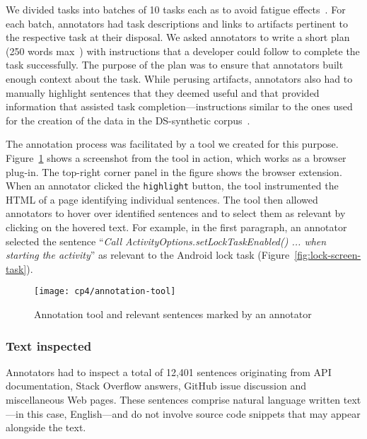 We divided tasks into batches of 10 tasks each as to avoid fatigue effects~\cite{Ponzanelli2017}. For each batch, annotators had task descriptions and links to artifacts pertinent to the respective task at their disposal. We asked annotators to write a short plan (250 words max~\cite{Rastkar2010}) with instructions that a developer could follow to complete the task successfully. 
The purpose of the plan was to ensure that annotators built enough context about the task.
While perusing artifacts, annotators also had to manually highlight sentences that they deemed useful and that provided information that assisted task completion---instructions similar to the ones used for the creation of the data in the \acs{DS-synthetic} corpus~\cite{marques2020}.


The annotation process was facilitated by a tool we created for this purpose. Figure~\ref{fig:corpus-annotation-tool} shows a screenshot from the tool in 
action, which works as a browser plug-in. The top-right corner panel in the figure shows the browser extension. When an annotator clicked the \texttt{highlight} button, 
the tool instrumented the HTML of a page identifying individual sentences. The tool then allowed annotators to hover over identified sentences and to select them as relevant by clicking on the hovered text. For example, in the first paragraph, an annotator selected  the sentence
``\textit{Call ActivityOptions.setLockTaskEnabled() ... when starting the activity}'' as relevant to the Android lock task (Figure~\ref{fig:lock-screen-task}).







\begin{figure}
    \centering
    \texttt{[image: cp4/annotation-tool]}
    \caption{Annotation tool and relevant sentences marked by an annotator}
    \label{fig:corpus-annotation-tool}
\end{figure}




\subsubsection{Text inspected}





Annotators had to inspect a total of 12,401 sentences originating from API documentation, Stack Overflow answers, GitHub issue discussion and miscellaneous Web pages.
These sentences comprise natural language written text---in this case, English---and do not involve source code snippets that may appear alongside the text.


